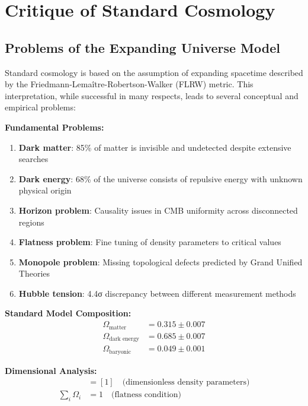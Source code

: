 \documentclass[12pt,a4paper]{report}
\begin{document}
	\section{Critique of Standard Cosmology}
	\label{sec:critique_standard_cosmology}
	
	\subsection{Problems of the Expanding Universe Model}
	\label{subsec:problems_space_expansion}
	
	Standard cosmology is based on the assumption of expanding spacetime described by the Friedmann-Lemaître-Robertson-Walker (FLRW) metric. This interpretation, while successful in many respects, leads to several conceptual and empirical problems:
	
	\textbf{Fundamental Problems:}
	\begin{enumerate}
		\item \textbf{Dark matter}: 85\% of matter is invisible and undetected despite extensive searches
		\item \textbf{Dark energy}: 68\% of the universe consists of repulsive energy with unknown physical origin
		\item \textbf{Horizon problem}: Causality issues in CMB uniformity across disconnected regions
		\item \textbf{Flatness problem}: Fine tuning of density parameters to critical values
		\item \textbf{Monopole problem}: Missing topological defects predicted by Grand Unified Theories
		\item \textbf{Hubble tension}: 4.4σ discrepancy between different measurement methods
	\end{enumerate}
	
	\textbf{Standard Model Composition:}
	\begin{align}
		\Omega_{\text{matter}} &= 0.315 \pm 0.007 \\
		\Omega_{\text{dark energy}} &= 0.685 \pm 0.007 \\
		\Omega_{\text{baryonic}} &= 0.049 \pm 0.001
	\end{align}
	
	\textbf{Dimensional Analysis:}
	\begin{align}
		[\Omega_i] &= [1] \quad \text{(dimensionless density parameters)} \\
		\sum_i \Omega_i &= 1 \quad \text{(flatness condition)}
	\end{align}
	
\end{document}
